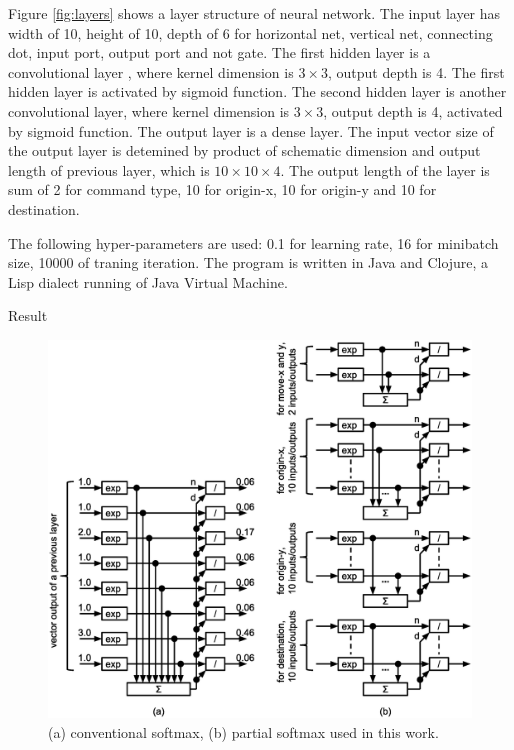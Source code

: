 \documentclass[twocolumn]{article}
\makeatletter
\def\section{\@startsection {section}{1}{\z@}{20pt plus 2pt minus 2pt}
{8pt plus 2pt minus 2pt}{\centering\normalsize\sc
\edef\@svsec{\thesection.\ }}}
\def\thesection{\Roman{section}}
\makeatother
\begin{document}
Figure \ref{fig:layers} shows a layer structure of neural network.
The input layer has width of 10, height of 10,
depth of 6 for horizontal net, vertical net, connecting dot, input port,
output port and not gate.
The first hidden layer is a convolutional layer \cite{mit},
where kernel dimension is $3\times 3$, output depth is 4.
The first hidden layer is activated by sigmoid function.
The second hidden layer is another convolutional layer,
where kernel dimension is $3\times 3$, output depth is 4,
activated by sigmoid function.
The output layer is a dense layer.
The input vector size of the output layer
is detemined by product of schematic dimension
and output length of previous layer, which is $10 \times 10 \times 4$.
The output length of the layer is sum of 2 for command type,
10 for origin-x, 10 for origin-y and 10 for destination.

The following hyper-parameters are used:
0.1 for learning rate, 16 for minibatch size, 10000 of traning iteration.
The program is written in Java and Clojure,
a Lisp dialect running of Java Virtual Machine.

\section{Result}

\begin{figure}[tb]
 \begin{center}
  \begin{minipage}{\hsize}
   \includegraphics[width=\hsize]{fig/partial_softmax_03.eps}
   \caption{(a) conventional softmax, (b) partial softmax used in this work.}
   \label{fig:paritial_softmax}
  \end{minipage}
 \end{center}
\end{figure}
\end{document}
